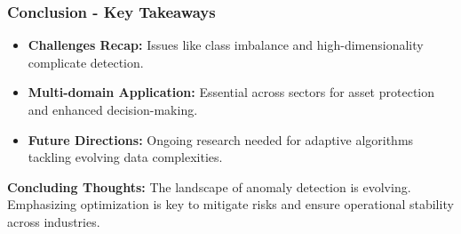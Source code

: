 \documentclass{beamer}
\begin{document}
\begin{frame}[fragile]
    \frametitle{Conclusion - Key Takeaways}
    \begin{itemize}
        \item \textbf{Challenges Recap:} Issues like class imbalance and high-dimensionality complicate detection.
        \item \textbf{Multi-domain Application:} Essential across sectors for asset protection and enhanced decision-making.
        \item \textbf{Future Directions:} Ongoing research needed for adaptive algorithms tackling evolving data complexities.
    \end{itemize}
    
    \textbf{Concluding Thoughts:} The landscape of anomaly detection is evolving. Emphasizing optimization is key to mitigate risks and ensure operational stability across industries.
\end{frame}
\end{document}

